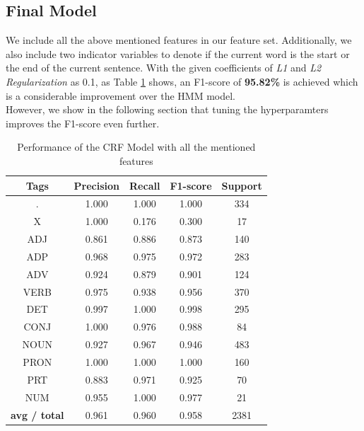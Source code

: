 \documentclass[12pt]{article}
\begin{document}
\subsection{Final Model}
We include all the above mentioned features in our feature set. Additionally, we also include two indicator variables to denote if the current word is the start or the end of the current sentence.
With the given coefficients of \textit{L1} and \textit{L2 Regularization} as 0.1, as Table \ref{tab:table7} shows, an F1-score of \textbf{95.82\%} is achieved which is a considerable improvement over  the HMM model.\\
However, we show in the following section that tuning the hyperparamters improves the F1-score even further.

\begin{table}[h!]
\begin{center}
    \caption{Performance of the CRF Model with all the mentioned features}
    \label{tab:table7}
\begin{tabular}{ c c c c c}
 \textbf{Tags}& \textbf{Precision} & \textbf{Recall} & \textbf{F1-score} & \textbf{Support} \\ 
 \hline

          .  &     1.000   &   1.000 &     1.000  &      334\\
          X   &    1.000    &  0.176 &     0.300  &       17\\
        ADJ &      0.861    &  0.886 &     0.873  &      140\\
        ADP   &    0.968   &    0.975 &     0.972 &      283\\
        ADV &      0.924  &    0.879  &    0.901   &     124\\
       VERB   &    0.975    &  0.938  &    0.956   &      370\\
        DET &      0.997    &  1.000 &     0.998  &      295\\
       CONJ   &    1.000     & 0.976 &     0.988  &       84\\
       NOUN &      0.927    &  0.967 &     0.946  &      483\\
       PRON   &    1.000  &    1.000 &     1.000 &       160\\
        PRT &      0.883    &  0.971 &     0.925 &        70\\
        NUM   &    0.955  &    1.000  &    0.977  &       21\\
\hline
\textbf{avg / total} &      0.961   &   0.960  &    0.958 &      2381

\end{tabular}
\end{center}
\end{table}
\end{document}
